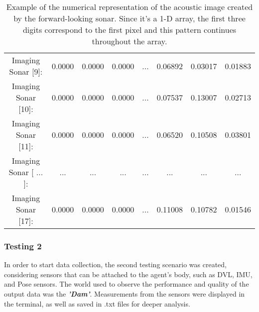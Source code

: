 \documentclass[]{article}
\begin{document}
\begin{table}[H]
\begin{center}
\begin{tabular}{cccccccc}
				\small Imaging Sonar [9]: & \small 0.0000 & \small 0.0000 & \small 0.0000 & \small ... & \small 0.06892 & \small 0.03017 & \small 0.01883\\
				
				\small Imaging Sonar [10]: & \small 0.0000 & \small 0.0000 & \small 0.0000 & \small ... & \small 0.07537 & \small 0.13007 & \small 0.02713\\
				
				\small Imaging Sonar [11]: & \small 0.0000 & \small 0.0000 & \small 0.0000 & \small ... & \small 0.06520 & \small 0.10508  & \small 0.03801\\
				
				\small Imaging Sonar [ ... ]: & \small ... & \small ... & \small ... & \small ... & \small ... & \small ...  & \small ... \\
				
				\small Imaging Sonar [17]: & \small 0.0000 & \small 0.0000 & \small 0.0000 & \small ... & \small 0.11008 & \small 0.10782 & \small 0.01546\\
				
				
				
				\bottomrule\end{tabular}
			\caption{Example of the numerical representation of the acoustic image created by the forward-looking sonar. Since it's a 1-D array, the first three digits correspond to the first pixel and this pattern continues throughout the array.}
		\end{center}
	\end{table}
	
	\subsubsection{Testing 2}
	
	In order to start data collection, the second testing scenario was created, considering sensors that can be attached to the agent's body, such as DVL, IMU, and Pose sensors. The world used to observe the performance and quality of the output data was the \textit{\textbf{'Dam'}}. Measurements from the sensors were displayed in the terminal, as well as saved in .txt files for deeper analysis.
	
\end{document}
